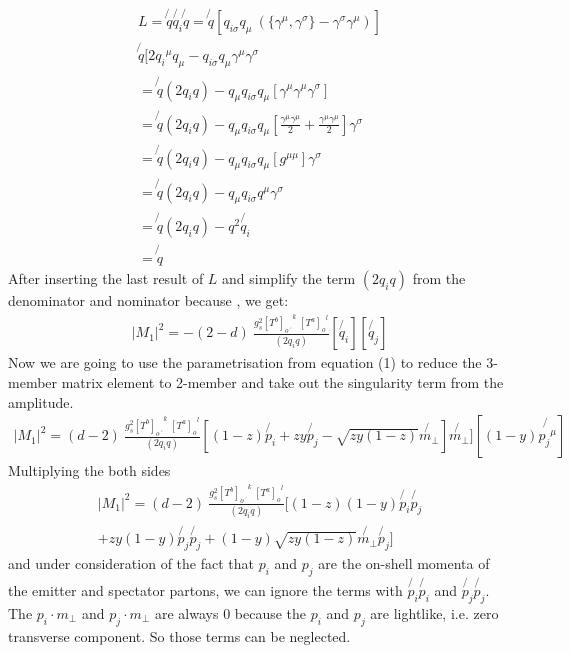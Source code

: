\begin{equation}
\begin{split}
L=\not{q} \not{q_i} \not{q} =\not{q}[{q_{i\sigma}} q_{\mu} \: (\lbrace{\gamma^{\mu}}, {\gamma^{\sigma}}\rbrace - {\gamma^{\sigma}}{\gamma^{\mu}})]\\ 
\not{q}[2{q_{i}}^{\mu} q_{\mu} - {q_{i\sigma}}q_{\mu}{\gamma^{\mu}}{\gamma^{\sigma}}\\
=\not{q} (2q_i q)-q_{\mu}{q_{i\sigma}}q_{\mu}[{\gamma^{\mu}}{\gamma^{\mu}}{\gamma^{\sigma}}]\\
=\not{q} (2q_i q)-q_{\mu}{q_{i\sigma}}q_{\mu}[\frac{{\gamma^{\mu}}{\gamma^{\mu}}}{2} +\frac{{\gamma^{\mu}}{\gamma^{\mu}}}{2}]{\gamma^{\sigma}}\\
=\not{q} (2q_i q)-q_{\mu}{q_{i\sigma}}q_{\mu}[g^{{\mu}{\mu}}]{\gamma^{\sigma}}\\
=\not{q} (2q_i q)-q_{\mu}{q_{i\sigma}}q^{\mu}{\gamma^{\sigma}}\\
=\not{q} (2q_i q)-q^2 \not{q_i}\\
=\not{q}
\end{split}
\end{equation}
After inserting the last result of $ L $ and simplify the term $ (2q_i q) $ from the denominator and nominator because , we get:
\begin{equation}
\begin{split}
|M_1|^2=-(2-d)\:\frac{g_s^2  {[T^b]_{o\:^{\prime}}}^k \: {[T^a]_o}^l }{(2q_i q)}
[\not{q_i}]
[\not{q_j}]
\end{split}
\end{equation}
Now we are going to use the parametrisation from equation (1) to reduce the 3-member matrix element to 2-member and take out the singularity term from the amplitude.
\begin{equation}
\begin{split}
|M_1|^2=(d-2)\:\frac{g_s^2  {[T^b]_{o\:^{\prime}}}^k \: {[T^a]_o}^l }{(2q_i q)}
[(1-z) \not{p_i}+zy \not{p_j} - \sqrt{zy(1-z)} \not{{m}_{\bot}}] \not{{m}_{\bot}}]
[(1-y) \not{{p_j}^{\mu}}]
\end{split}
\end{equation}
Multiplying the both sides 
\begin{equation}
\begin{split}
|M_1|^2=(d-2)\:\frac{g_s^2  {[T^b]_{o\:^{\prime}}}^k \: {[T^a]_o}^l }{(2q_i q)}
[(1-z)(1-y) \not{p_i}\not{p_j} \\
+zy(1-y) \not{p_j}\not{p_j} + (1-y)\sqrt{zy(1-z)} \not{{m}_{\bot}}\not{p_j}]
\end{split}
\end{equation}
and under consideration of the fact that $ p_i $ and $ p_j $ are the on-shell momenta of the emitter and spectator partons, we can ignore the terms with $ \not{p_i} \not{p_i} $ and $ \not{p_j} \not{p_j} $.
The $ {p_i} \cdot  {m}_{\bot} $ and $ {p_j} \cdot  {m}_{\bot} $ are always $ 0 $ because the $ p_i $ and $ p_j $ are lightlike, i.e. zero transverse component. So those terms can be neglected.


